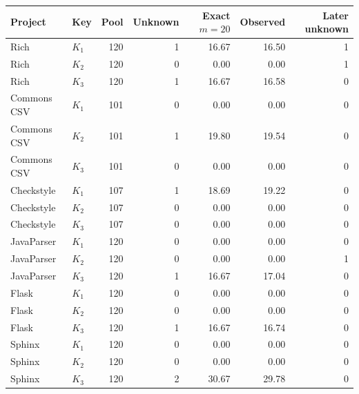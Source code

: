 \begin{tabular}{llrrrrr}
\toprule
Project & Key & Pool & Unknown & Exact $m=20$ & Observed & Later unknown \\
\midrule
Rich & $K_1$ & 120 & 1 & 16.67 & 16.50 & 1 \\
Rich & $K_2$ & 120 & 0 & 0.00 & 0.00 & 1 \\
Rich & $K_3$ & 120 & 1 & 16.67 & 16.58 & 0 \\
Commons CSV & $K_1$ & 101 & 0 & 0.00 & 0.00 & 0 \\
Commons CSV & $K_2$ & 101 & 1 & 19.80 & 19.54 & 0 \\
Commons CSV & $K_3$ & 101 & 0 & 0.00 & 0.00 & 0 \\
Checkstyle & $K_1$ & 107 & 1 & 18.69 & 19.22 & 0 \\
Checkstyle & $K_2$ & 107 & 0 & 0.00 & 0.00 & 0 \\
Checkstyle & $K_3$ & 107 & 0 & 0.00 & 0.00 & 0 \\
JavaParser & $K_1$ & 120 & 0 & 0.00 & 0.00 & 0 \\
JavaParser & $K_2$ & 120 & 0 & 0.00 & 0.00 & 1 \\
JavaParser & $K_3$ & 120 & 1 & 16.67 & 17.04 & 0 \\
Flask & $K_1$ & 120 & 0 & 0.00 & 0.00 & 0 \\
Flask & $K_2$ & 120 & 0 & 0.00 & 0.00 & 0 \\
Flask & $K_3$ & 120 & 1 & 16.67 & 16.74 & 0 \\
Sphinx & $K_1$ & 120 & 0 & 0.00 & 0.00 & 0 \\
Sphinx & $K_2$ & 120 & 0 & 0.00 & 0.00 & 0 \\
Sphinx & $K_3$ & 120 & 2 & 30.67 & 29.78 & 0 \\
\bottomrule
\end{tabular}
